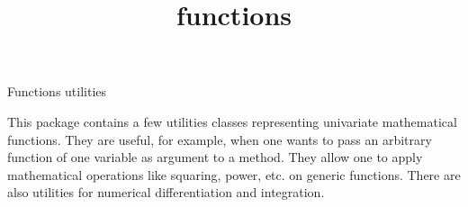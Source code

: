 \documentclass[12pt]{article}
\begin{document}
\begin{titlepage}
\title{functions}{Functions utilities}

\vfill
This package contains a few utilities classes representing univariate 
mathematical functions. They are useful, for example, when one wants to pass
an arbitrary function of one variable as argument to a method.
They allow one to apply mathematical operations like squaring, power, etc.
on generic functions. There are also utilities for numerical
differentiation and integration. 
\vfill
\end{titlepage}


\tableofcontents















%
\end{document}
